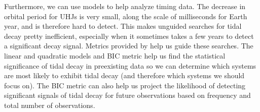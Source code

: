 \documentclass[oneside,12pt]{amsart}
\numberwithin{page}{section}
\begin{document}



Furthermore, we can use models to help analyze timing data. The decrease in orbital period for UHJs is very small, along the scale of milliseconds for Earth year, and is therefore hard to detect. This makes unguided searches for tidal decay pretty inefficient, especially when it sometimes takes a few years to detect a significant decay signal. Metrics provided by \citet{jackson2023metrics} help us guide these searches. The linear and quadratic models and BIC metric help us find the statistical significance of tidal decay in preexisting data so we can determine which systems are most likely to exhibit tidal decay (and therefore which systems we should focus on). The BIC metric can also help us project the likelihood of detecting significant signals of tidal decay for future observations based on frequency and total number of observations.
\end{document}
